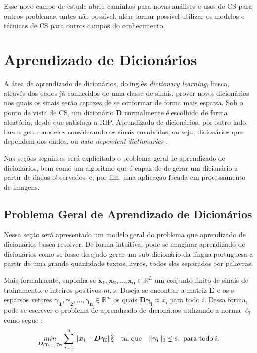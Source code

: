 \documentclass[cic,tc]{iiufrgs}
\def\SPSB#1#2{\rlap{\textsuperscript{#1}}\SB{#2}}
\def\SB#1{\textsubscript{#1}}
\renewcommand{\vec}[1]{\bm{#1}}
\newcommand{\mat}[1]{\bm{#1}}
\begin{document}
Esse novo campo de estudo abriu caminhos para novas análises e usos de CS para outros
problemas, antes não possível, além tornar possível utilizar os modelos e técnicas de CS
para outros campos do conhecimento.


\section{Aprendizado de Dicionários}
A área de aprendizado de dicionários, do inglês \textit{dictionary learning}, busca, através
dos dados já conhecidos de uma classe de sinais, prover novos dicionários nos quais os sinais 
serão capazes de se conformar de forma mais esparsa. 
Sob o ponto de vista de CS, um dicionário $\mat{D}$ normalmente é escolhido de forma aleatória,
desde que satisfaça a RIP.
Aprendizado de dicionários, por outro lado, busca gerar modelos considerando os sinais envolvidos,
ou seja, dicionários que dependem dos dados, ou \textit{data-dependent dictionaries} \cite{chen2015compressed}.

Nas seções seguintes será explicitado o problema geral de aprendizado de dicionários, bem como 
um algoritmo que é capaz de de gerar um dicionário a partir de dados observados, e, por fim, 
uma aplicação focada em processamento de imagens.

\subsection{Problema Geral de Aprendizado de Dicionários}
Nessa seção será apresentado um modelo geral do problema que aprendizado de dicionários busca resolver.
De forma intuitiva, pode-se imaginar aprendizado de dicionários como se fosse desejado gerar 
um sub-dicionário da língua portuguesa a partir de uma grande quantidade textos, livros, todos 
eles separados por palavras.

Mais formalmente, suponha-se $\vec{x_1}, \vec{x_2}, ..., \vec{x_n} \in \mathbb{R}^L$
um conjunto finito de sinais de trainamento, e inteiros positivos $m, s$.
Deseja-se encontrar a matriz $\mat{D}$ e os s-esparsos vetores 
$\vec{\gamma_1}, \vec{\gamma_2}, ..., \vec{\gamma_n} \in \mathbb{R}^m$ os quais
$\mat{D}\vec{\gamma_i} \approx x_i$ para todo $i$. Dessa forma, pode-se escrever o problema
de aprendizado de dicionários utilizando a norma $\ell_2$ como segue  \cite{chen2015compressed}:
\begin{equation}
    \label{eq:dlgeneral}
    \underset{\mat{D}, \vec{\gamma_1}...\vec{\gamma_n}}{min} 
    \sum_{i=1}^{n} {\lVert  \vec{x_i} - \mat{D} \vec{\gamma_i} \rVert \SPSB{2}{2}}
    \hspace{1em} \text{tal que} \hspace{1em}
    \lVert \vec{\gamma_i} \rVert_0 \le s, \text{ para todo } i.
\end{equation}
\end{document}
